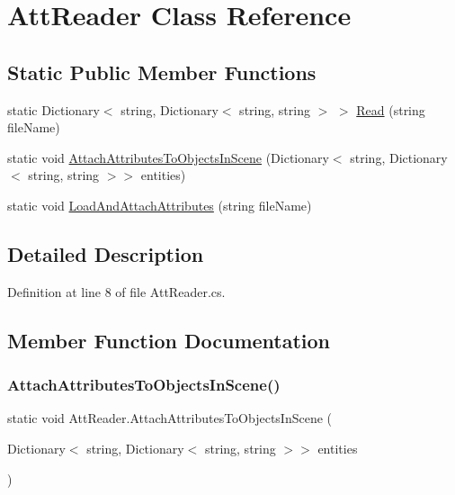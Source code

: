 \hypertarget{class_att_reader}{}\section{Att\+Reader Class Reference}
\label{class_att_reader}
\subsection*{Static Public Member Functions}
\begin{DoxyCompactItemize}
\item 
static Dictionary$<$ string, Dictionary$<$ string, string $>$ $>$ \mbox{\hyperlink{class_att_reader_a52bf4faee965d1c5ef725eed6dad42a6}{Read}} (string file\+Name)
\item 
static void \mbox{\hyperlink{class_att_reader_a099df7907dc312646dfb9f55c84c41fd}{Attach\+Attributes\+To\+Objects\+In\+Scene}} (Dictionary$<$ string, Dictionary$<$ string, string $>$$>$ entities)
\item 
static void \mbox{\hyperlink{class_att_reader_abec2d3da93fe798b11e4ba34a4289580}{Load\+And\+Attach\+Attributes}} (string file\+Name)
\end{DoxyCompactItemize}


\subsection{Detailed Description}


Definition at line 8 of file Att\+Reader.\+cs.



\subsection{Member Function Documentation}
\mbox{\label{class_att_reader_a099df7907dc312646dfb9f55c84c41fd}} 
\subsubsection{\texorpdfstring{AttachAttributesToObjectsInScene()}{AttachAttributesToObjectsInScene()}}
{\footnotesize\ttfamily static void Att\+Reader.\+Attach\+Attributes\+To\+Objects\+In\+Scene (\begin{DoxyParamCaption}\item[{Dictionary$<$ string, Dictionary$<$ string, string $>$$>$}]{entities }\end{DoxyParamCaption})\hspace{0.3cm}{\ttfamily [static]}}



